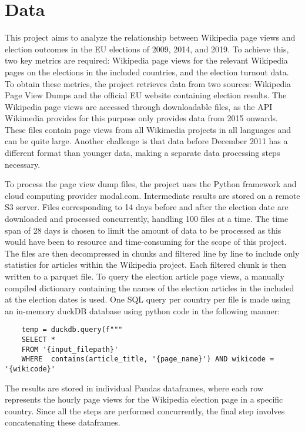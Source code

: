 \chapter{Data}
\label{sec:data}
This project aims to analyze the relationship between Wikipedia page views and election outcomes in the EU elections of 2009, 2014, and 2019. To achieve this, two key metrics are required: Wikipedia page views for the relevant Wikipedia pages on the elections in the included countries, and the election turnout data. To obtain these metrics, the project retrieves data from two sources: Wikipedia Page View Dumps and the official EU website containing election results. The Wikipedia page views are accessed through downloadable files, as the API Wikimedia provides for this purpose only provides data from 2015 onwards. These files contain page views from all Wikimedia projects in all languages and can be quite large. Another challenge is that data before December 2011 has a different format than younger data, making a separate data processing steps necessary.

To process the page view dump files, the project uses the Python framework and cloud computing provider modal.com. Intermediate results are stored on a remote S3 server.  Files corresponding to 14 days before and after the election date are downloaded and processed concurrently, handling 100 files at a time. The time span of 28 days is chosen to limit the amount of data to be processed as this would have been to resource and time-consuming for the scope of this project. The files are then decompressed in chunks and filtered line by line to include only statistics for articles within the Wikipedia project. Each filtered chunk is then written to a parquet file. To query the election article page views, a manually compiled dictionary containing the names of the election articles in the included at the election dates is used. One SQL query per country per file is made using an in-memory duckDB database using python code in the following manner:

\begin{verbatim}
    temp = duckdb.query(f"""
    SELECT *
    FROM '{input_filepath}'
    WHERE  contains(article_title, '{page_name}') AND wikicode = '{wikicode}'
\end{verbatim}

The results are stored in individual Pandas dataframes, where each row represents the hourly page views for the Wikipedia election page in a specific country. Since all the steps are performed concurrently, the final step involves concatenating these dataframes.




